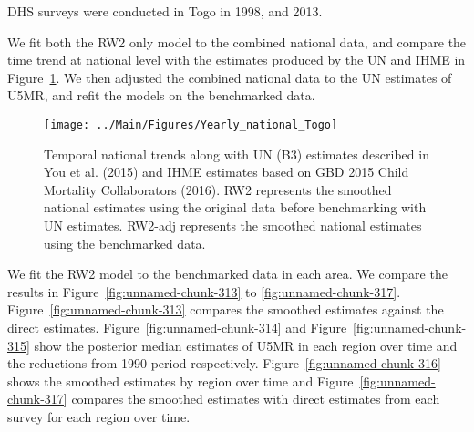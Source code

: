 \documentclass[12pt]{article}\usepackage[]{graphicx}\usepackage[]{color}
\newenvironment{knitrout}{}{} %
\begin{document}


DHS surveys were conducted in Togo in 1998, and 2013.

We fit both the RW2 only model to the combined national data, and compare the time trend at national level with the estimates produced by the UN and IHME in Figure~\ref{fig:unnamed-chunk-312}. We then adjusted the combined national data to the UN estimates of U5MR, and refit the models on the benchmarked data. 

\begin{knitrout}
\color{fgcolor}\begin{figure}[bht]

{\centering \texttt{[image: ../Main/Figures/Yearly\_national\_Togo]} 

}

\caption[Temporal national trends along with UN (B3) estimates described in You et al]{Temporal national trends along with UN (B3) estimates described in You et al. (2015) and IHME estimates based on GBD 2015 Child Mortality Collaborators (2016). RW2 represents the smoothed national estimates using the original data before benchmarking with UN estimates. RW2-adj represents the smoothed national estimates using the benchmarked data.}\label{fig:unnamed-chunk-312}
\end{figure}


\end{knitrout}
 

We fit the RW2 model to the benchmarked data in each area. 
We compare the results in Figure~\ref{fig:unnamed-chunk-313} to \ref{fig:unnamed-chunk-317}.
Figure~\ref{fig:unnamed-chunk-313} compares the smoothed estimates against the direct estimates. Figure~\ref{fig:unnamed-chunk-314} and Figure~\ref{fig:unnamed-chunk-315} show the posterior median estimates of U5MR in each region over time and the reductions from 1990 period respectively.
Figure~\ref{fig:unnamed-chunk-316} shows the smoothed estimates by region over time and Figure~\ref{fig:unnamed-chunk-317} compares the smoothed estimates with direct estimates from each survey for each region over time.


\end{document}
